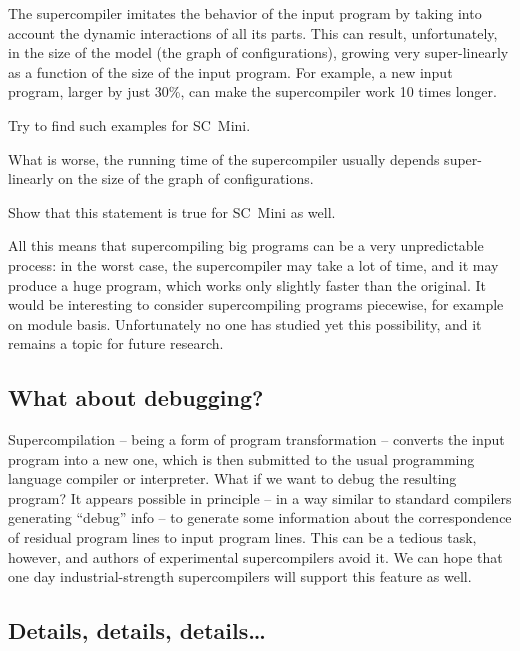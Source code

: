 The supercompiler imitates the behavior of the input program by taking into
account the dynamic interactions of all its parts.
This can result, unfortunately, in the size of the model (the graph of configurations),
growing very super-linearly as a function of the size of the input program.
For example, a new input program, larger by just 30\%, can make the
supercompiler work 10 times longer.

\begin{exercise}
Try to find such examples for SC~Mini.
\end{exercise}

What is worse, the running time of the supercompiler usually 
depends super-linearly on the size of the graph of configurations.

\begin{exercise}
Show that this statement is true for SC~Mini as well.
\end{exercise}

All this means that supercompiling big programs can be a very unpredictable process:
in the worst case, the supercompiler may take a lot of time, and it may
produce a huge program, which works only slightly faster than the original.
It would be interesting to consider supercompiling
programs piecewise, for example on module basis.
Unfortunately no one has studied yet this possibility,
and it remains a topic for future research.

\subsection{What about debugging?}

Supercompilation -- being a form of program transformation -- converts the
input program into a new one, which is then submitted to the usual
programming language compiler or interpreter.
What if we want to debug the resulting program?
It appears possible in principle -- in a way similar to
standard compilers generating ``debug'' info --
to generate some information about the correspondence of
residual program lines to input program lines.
This can be a tedious task, however, and
authors of experimental supercompilers avoid it.
We can hope that one day industrial-strength supercompilers
will support this feature as well.

\subsection{Details, details, details\ldots}


